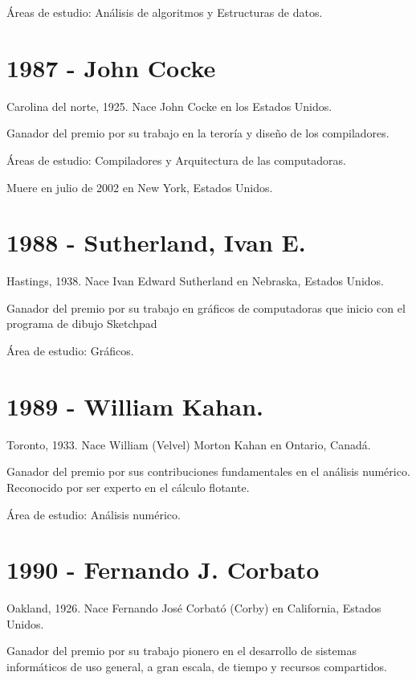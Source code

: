 \documentclass[notitlepage,letterpaper, 11pt]{article}
\begin{document}
\noindent Áreas de estudio: Análisis de algoritmos y Estructuras de datos.
\newline

\section*{1987 - John Cocke}
\noindent Carolina del norte, 1925. Nace John Cocke en los Estados Unidos.

\noindent Ganador del premio por su trabajo en la teroría y diseño de los compiladores.

\noindent Áreas de estudio: Compiladores y Arquitectura de las computadoras.

\noindent Muere en julio de 2002 en New York, Estados Unidos.
\newline

\section*{1988 - Sutherland, Ivan E.}
\noindent Hastings, 1938. Nace Ivan Edward Sutherland en Nebraska, Estados Unidos.

\noindent Ganador del premio por su trabajo en gráficos de computadoras que inicio con el programa de dibujo Sketchpad

\noindent Área de estudio: Gráficos.
\newline

\section*{1989 - William Kahan.}
\noindent Toronto, 1933. Nace William (Velvel) Morton Kahan en Ontario, Canadá.

\noindent Ganador del premio por sus contribuciones fundamentales en el análisis numérico. Reconocido por ser experto en el cálculo flotante.

\noindent Área de estudio: Análisis numérico.
\newline

\section*{1990 - Fernando J. Corbato}
\noindent Oakland, 1926. Nace Fernando José Corbató (Corby) en California, Estados Unidos.

\noindent Ganador del premio por su trabajo pionero en el desarrollo de sistemas informáticos de uso general, a gran escala, de tiempo y recursos compartidos. 
\end{document}
